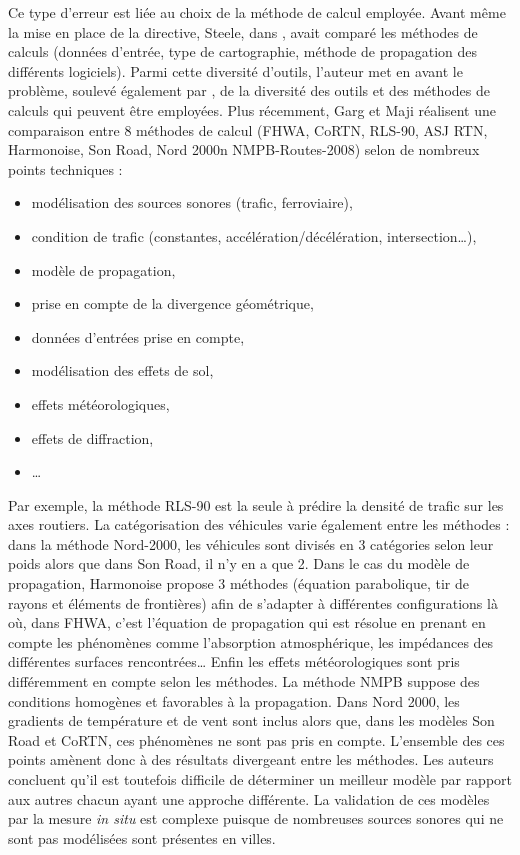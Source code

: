 Ce type d'erreur est liée au choix de la méthode de calcul employée. Avant même la mise en place de la directive, Steele, dans \cite{steele_critical_2001}, avait comparé les méthodes de calculs (données d'entrée, type de cartographie, méthode de propagation des différents logiciels). Parmi cette diversité d'outils, l'auteur met en avant le problème, soulevé également par \cite{king_implementation_2011}, de la diversité des outils et des méthodes de calculs qui peuvent être employées. Plus récemment, Garg et Maji \cite{garg_critical_2014} réalisent une comparaison entre 8 méthodes de calcul (FHWA, CoRTN, RLS-90, ASJ RTN, Harmonoise, Son Road, Nord 2000n NMPB-Routes-2008) selon de nombreux points techniques :

\begin{itemize}
\item modélisation des sources sonores (trafic, ferroviaire),
\item condition de trafic (constantes, accélération/décélération, intersection\dots),
\item modèle de propagation,
\item prise en compte de la divergence géométrique,
\item données d'entrées prise en compte,
\item modélisation des effets de sol,
\item effets météorologiques,
\item effets de diffraction,
\item \dots  \\
\end{itemize}

Par exemple, la méthode RLS-90 est la seule à prédire la densité de trafic sur les axes routiers. La catégorisation des véhicules varie également entre les méthodes : dans la méthode Nord-2000, les véhicules sont divisés en 3 catégories selon leur poids alors que dans Son Road, il n'y en a que 2. Dans le cas du modèle de propagation, Harmonoise propose 3 méthodes (équation parabolique, tir de rayons et éléments de frontières) afin de s'adapter à différentes configurations là où, dans FHWA, c'est l'équation de propagation qui est résolue en prenant en compte les phénomènes comme l'absorption atmosphérique, les impédances des différentes surfaces rencontrées\dots{} Enfin les effets météorologiques sont pris différemment en compte selon les méthodes. La méthode NMPB suppose des conditions homogènes et favorables à la propagation. Dans Nord 2000, les gradients de température et de vent sont inclus alors que, dans les modèles Son Road et CoRTN, ces phénomènes ne sont pas pris en compte. L'ensemble des ces points amènent donc à des résultats divergeant entre les méthodes.
Les auteurs concluent qu'il est toutefois difficile de déterminer un \og meilleur \fg{} modèle par rapport aux autres chacun ayant une approche différente. La validation de ces modèles par la mesure \textit{in situ} est complexe puisque de nombreuses sources sonores qui ne sont pas modélisées sont présentes en villes.

